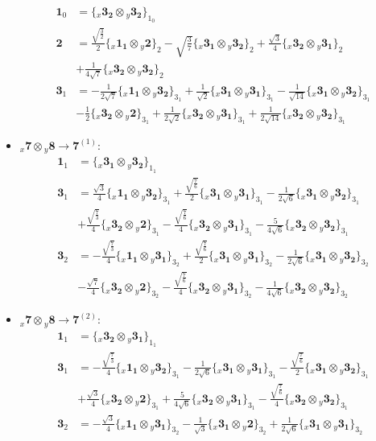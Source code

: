 \documentclass[english]{article}
\newcommand{\rep}[1]{\mathbf{#1}}
\newcommand{\repx}[2]{{}_{#2}\mathbf{#1}}
\newcommand{\tsprodx}[2]{\repx{#1}{x}\otimes\repx{#2}{y}}
\newcommand{\subcgs}[3]{\big\{ \tsprodx{#1}{#2}\big\}^{}_{#3}}
\begin{document}
\begin{itemize}
\begin{align*}
\rep{1}_{0} & = \subcgs{3_{2}}{3_{2}}{1_{0}}
\\
\rep{2} & = \frac{\sqrt{\frac{3}{2}}}{2}\subcgs{1_{1}}{2}{2}-\sqrt{\frac{3}{7}}\subcgs{3_{1}}{3_{2}}{2}+\frac{\sqrt{3}}{4}\subcgs{3_{2}}{3_{1}}{2} \\ 
 & +\frac{1}{4 \sqrt{7}}\subcgs{3_{2}}{3_{2}}{2}
\\
\rep{3}_{1} & = -\frac{1}{2 \sqrt{7}}\subcgs{1_{1}}{3_{2}}{3_{1}}+\frac{1}{\sqrt{2}}\subcgs{3_{1}}{3_{1}}{3_{1}}-\frac{1}{\sqrt{14}}\subcgs{3_{1}}{3_{2}}{3_{1}} \\ 
 & -\frac{1}{2}\subcgs{3_{2}}{2}{3_{1}}+\frac{1}{2 \sqrt{2}}\subcgs{3_{2}}{3_{1}}{3_{1}}+\frac{1}{2 \sqrt{14}}\subcgs{3_{2}}{3_{2}}{3_{1}}
\end{align*}
\item $\tsprodx{7}{8}\to\rep{7}^{(1)}$:
\begin{align*}
\rep{1}_{1} & = \subcgs{3_{1}}{3_{2}}{1_{1}}
\\
\rep{3}_{1} & = \frac{\sqrt{3}}{4}\subcgs{1_{1}}{3_{2}}{3_{1}}+\frac{\sqrt{\frac{7}{6}}}{2}\subcgs{3_{1}}{3_{1}}{3_{1}}-\frac{1}{2 \sqrt{6}}\subcgs{3_{1}}{3_{2}}{3_{1}} \\ 
 & +\frac{\sqrt{\frac{7}{3}}}{4}\subcgs{3_{2}}{2}{3_{1}}-\frac{\sqrt{\frac{7}{6}}}{4}\subcgs{3_{2}}{3_{1}}{3_{1}}-\frac{5}{4 \sqrt{6}}\subcgs{3_{2}}{3_{2}}{3_{1}}
\\
\rep{3}_{2} & = -\frac{\sqrt{\frac{7}{3}}}{4}\subcgs{1_{1}}{3_{1}}{3_{2}}+\frac{\sqrt{\frac{7}{6}}}{2}\subcgs{3_{1}}{3_{1}}{3_{2}}-\frac{1}{2 \sqrt{6}}\subcgs{3_{1}}{3_{2}}{3_{2}} \\ 
 & -\frac{\sqrt{7}}{4}\subcgs{3_{2}}{2}{3_{2}}-\frac{\sqrt{\frac{7}{6}}}{4}\subcgs{3_{2}}{3_{1}}{3_{2}}-\frac{1}{4 \sqrt{6}}\subcgs{3_{2}}{3_{2}}{3_{2}}
\end{align*}
\item $\tsprodx{7}{8}\to\rep{7}^{(2)}$:
\begin{align*}
\rep{1}_{1} & = \subcgs{3_{2}}{3_{1}}{1_{1}}
\\
\rep{3}_{1} & = -\frac{\sqrt{\frac{7}{3}}}{4}\subcgs{1_{1}}{3_{2}}{3_{1}}-\frac{1}{2 \sqrt{6}}\subcgs{3_{1}}{3_{1}}{3_{1}}-\frac{\sqrt{\frac{7}{6}}}{2}\subcgs{3_{1}}{3_{2}}{3_{1}} \\ 
 & +\frac{\sqrt{3}}{4}\subcgs{3_{2}}{2}{3_{1}}+\frac{5}{4 \sqrt{6}}\subcgs{3_{2}}{3_{1}}{3_{1}}-\frac{\sqrt{\frac{7}{6}}}{4}\subcgs{3_{2}}{3_{2}}{3_{1}}
\\
\rep{3}_{2} & = -\frac{\sqrt{3}}{4}\subcgs{1_{1}}{3_{1}}{3_{2}}-\frac{1}{\sqrt{3}}\subcgs{3_{1}}{2}{3_{2}}+\frac{1}{2 \sqrt{6}}\subcgs{3_{1}}{3_{1}}{3_{2}} \\ 

\end{align*}
\end{itemize}
\end{document}
